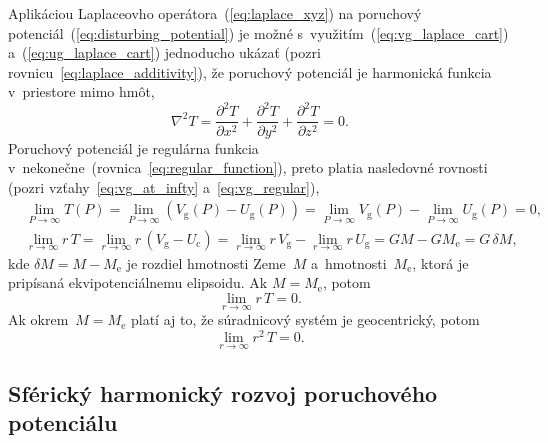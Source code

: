 \documentclass[a4paper,12pt]{book}
\newcommand{\gidx}{\mathrm g}
\newcommand{\cidx}{\mathrm c}
\begin{document}
Aplikáciou Laplaceovho operátora~(\ref{eq:laplace_xyz}) na poruchový 
potenciál~(\ref{eq:disturbing_potential}) je možné 
s~využitím~(\ref{eq:vg_laplace_cart}) a~(\ref{eq:ug_laplace_cart}) jednoducho 
ukázať (pozri rovnicu~\ref{eq:laplace_additivity}), že poruchový potenciál je 
harmonická funkcia v~priestore mimo hmôt,
%
\begin{equation}
\label{eq:laplace_xyz_t}
\nabla^2 T = \frac{\partial^2 T}{\partial x^2} + \frac{\partial^2 T}{\partial 
y^2} + \frac{\partial^2 T}{\partial z^2} = 0{.}
\end{equation}
%
Poruchový potenciál je regulárna funkcia 
v~nekonečne~(rovnica~\ref{eq:regular_function}), preto platia nasledovné 
rovnosti (pozri vzťahy~\ref{eq:vg_at_infty} a~\ref{eq:vg_regular}),
%
\begin{align}
\label{eq:t_infty}
&\lim_{P \rightarrow \infty} T(P) = \lim_{P \rightarrow \infty} (V_\gidx(P) 
- U_\gidx(P)) = \lim_{P \rightarrow \infty} V_\gidx(P) - \lim_{P \rightarrow 
\infty} U_\gidx(P) = 0{,}\\
%
\label{eq:t_regular}
&\lim_{r \rightarrow \infty} r \, T = \lim_{r \rightarrow \infty} r \, (V_\gidx 
 - U_\cidx) = \lim_{r \rightarrow \infty} r \, V_\gidx - \lim_{r \rightarrow 
 \infty} r \, U_\gidx = GM - GM_{\mathrm{e}} = G \, \delta M{,}
\end{align}
%
kde $\delta M = M - M_\mathrm{e}$ je rozdiel hmotnosti Zeme~$M$ 
a~hmotnosti~$M_\mathrm{e}$, ktorá je pripísaná ekvipotenciálnemu elipsoidu.  Ak 
$M = M_\mathrm{e}$, potom
%
\begin{equation}
\lim_{r \rightarrow \infty} r \, T = 0{.}
\end{equation}
%
Ak okrem~$M = M_\mathrm{e}$ platí aj to, že súradnicový systém je geocentrický, 
potom \parencite{Pick1973}
%
\begin{equation}
\lim_{r \rightarrow \infty} r^2 \, T = 0{.}
\end{equation}


\subsection{Sférický harmonický rozvoj poruchového potenciálu}
\end{document}

